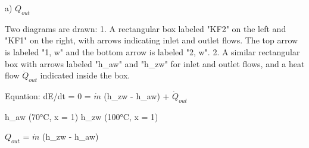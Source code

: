 a) \( Q_{out} \)  

Two diagrams are drawn:  
1. A rectangular box labeled "KF2" on the left and "KF1" on the right, with arrows indicating inlet and outlet flows. The top arrow is labeled "1, w" and the bottom arrow is labeled "2, w".  
2. A similar rectangular box with arrows labeled "h_{aw}" and "h_{zw}" for inlet and outlet flows, and a heat flow \( \dot{Q}_{out} \) indicated inside the box.  

Equation:  
dE/dt = 0 = \( \dot{m} \) (h_{zw} - h_{aw}) + \( \dot{Q}_{out} \)  

h_{aw} (70°C, x = 1)  
h_{zw} (100°C, x = 1)  

\( Q_{out} \) = \( \dot{m} \) (h_{zw} - h_{aw})